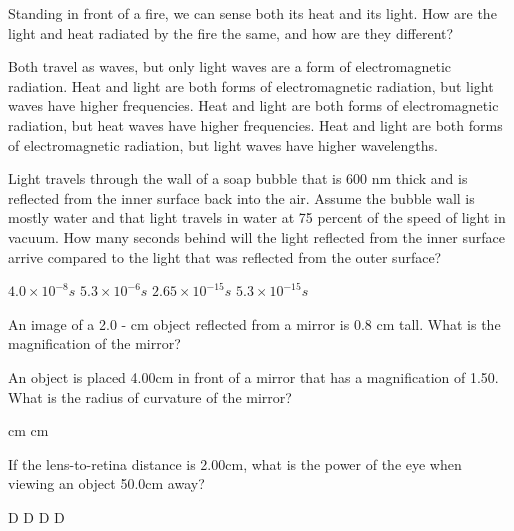 \documentclass[12pt,addpoints]{exam}
\begin{document}
{{{\begin{questions}
					\question Standing in front of a fire, we can sense both its heat and its light. How are the light and heat radiated by the fire the same, and how are they different?
					\begin{choices}
						\choice Both travel as waves, but only light waves are a form of electromagnetic radiation.
						\choice Heat and light are both forms of electromagnetic radiation, but light waves have higher frequencies.
						\choice Heat and light are both forms of electromagnetic radiation, but heat waves have higher frequencies.
						\choice Heat and light are both forms of electromagnetic radiation, but light waves have higher wavelengths.
					\end{choices}
					\question Light travels through the wall of a soap bubble that is 600 nm thick and is reflected from the inner surface back into the air. Assume the bubble wall is mostly water and that light travels in water at 75 percent of the speed of light in vacuum. How many seconds behind will the light reflected from the inner surface arrive compared to the light that was reflected from the outer surface?\\
					\begin{oneparchoices}
						\choice $4.0 \times 10^{-8} s$
						\choice $5.3 \times 10^{-6} s$
						\choice $2.65 \times 10^{-15} s$
						\choice $5.3 \times 10^{-15} s$
					\end{oneparchoices}
					\question An image of a 2.0 - cm object reflected from a mirror is 0.8 cm tall. What is the magnification of the mirror? \\
					\begin{oneparchoices}
						\choice 0.4
						\choice 2.5
						\choice 3
						\choice 10
					\end{oneparchoices}
					\question An object is placed 4.00cm in front of a mirror that has a magnification of 1.50. What is the radius of curvature of the mirror? \\
					\begin{oneparchoices}
						\choice -24 cm
						\choice -4.8cm
						\choice 24 cm
						\choice 4.8cm
					\end{oneparchoices}
					\question If the lens-to-retina distance is  2.00cm, what is the power of the eye when viewing an object  50.0cm
					away?\\
					\begin{oneparchoices}
						\choice 52.0 D
						\choice 1.92 D
						\choice -52.0 D
						\choice 0.52 D
					\end{oneparchoices}

\end{questions}}}}
\end{document}
